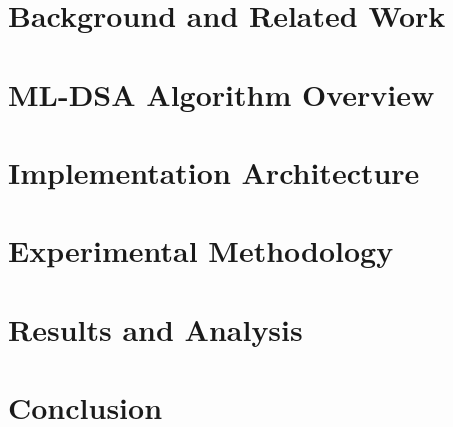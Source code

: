\documentclass[journal=tches,final]{iacrtrans}
\begin{document}
\color{black}

\section{Background and Related Work}

\section{ML-DSA Algorithm Overview}

\section{Implementation Architecture}

\section{Experimental Methodology}

\section{Results and Analysis}

\section{Conclusion}

\newpage



\end{document}
